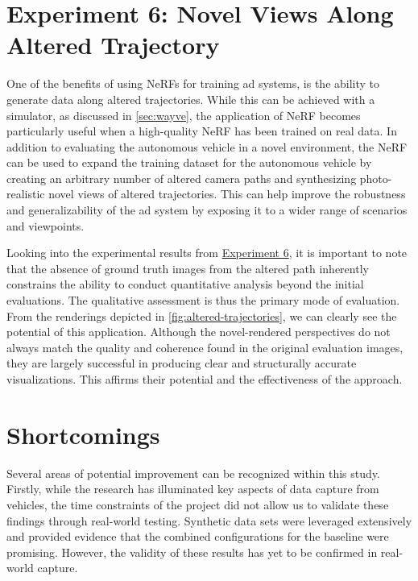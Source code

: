 \begin{comment}
- The estimation could be further improved by investigating techniques for leveraging more of the contained data.
- The NAPLab car's accelerometer could be used to calculate roll and pitch.
- LiDAR data could be used for further pose estimation
\end{comment}





\section{Experiment 6: Novel Views Along Altered Trajectory}
One of the benefits of using NeRFs for training \acrshort{ad} systems, is the ability to generate data along altered trajectories. While this can be achieved with a simulator, as discussed in \autoref{sec:wayve}, the application of NeRF becomes particularly useful when a high-quality NeRF has been trained on real data. In addition to evaluating the autonomous vehicle in a novel environment, the NeRF can be used to expand the training dataset for the autonomous vehicle by creating an arbitrary number of altered camera paths and synthesizing photo-realistic novel views of altered trajectories. This can help improve the robustness and generalizability of the \acrshort{ad} system by exposing it to a wider range of scenarios and viewpoints.

Looking into the experimental results from \hyperref[sec:altered-trajectories]{Experiment 6}, it is important to note that the absence of ground truth images from the altered path inherently constrains the ability to conduct quantitative analysis beyond the initial evaluations. The qualitative assessment is thus the primary mode of evaluation. From the renderings depicted in \autoref{fig:altered-trajectories}, we can clearly see the potential of this application. Although the novel-rendered perspectives do not always match the quality and coherence found in the original evaluation images, they are largely successful in producing clear and structurally accurate visualizations. This affirms their potential and the effectiveness of the approach.



\section{Shortcomings}
Several areas of potential improvement can be recognized within this study. Firstly, while the research has illuminated key aspects of data capture from vehicles, the time constraints of the project did not allow us to validate these findings through real-world testing. Synthetic data sets were leveraged extensively and provided evidence that the combined configurations for the baseline were promising. However, the validity of these results has yet to be confirmed in real-world capture.

